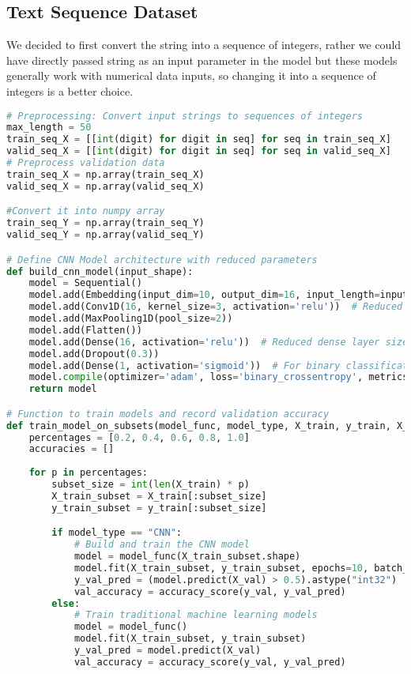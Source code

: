 \documentclass{article} %
\begin{document}
\subsection{Text Sequence Dataset} 
We decided to first convert the string into a sequence of integers, rather we could have directly passed string as an input parameter in the model but these models generally work with numerical data inputs, so changing it into a sequence of integers is a better choice. 

\begin{lstlisting}[language=Python]
# Preprocessing: Convert input strings to sequences of integers
max_length = 50
train_seq_X = [[int(digit) for digit in seq] for seq in train_seq_X]
valid_seq_X = [[int(digit) for digit in seq] for seq in valid_seq_X] 
# Preprocess validation data
train_seq_X = np.array(train_seq_X)
valid_seq_X = np.array(valid_seq_X)

#Convert it into numpy array
train_seq_Y = np.array(train_seq_Y)
valid_seq_Y = np.array(valid_seq_Y)

# Define CNN Model architecture with reduced parameters
def build_cnn_model(input_shape):
    model = Sequential()
    model.add(Embedding(input_dim=10, output_dim=16, input_length=input_shape[1]))  # Reduced embedding dimension
    model.add(Conv1D(16, kernel_size=3, activation='relu'))  # Reduced number of filters
    model.add(MaxPooling1D(pool_size=2))
    model.add(Flatten())
    model.add(Dense(16, activation='relu'))  # Reduced dense layer size
    model.add(Dropout(0.3))
    model.add(Dense(1, activation='sigmoid'))  # For binary classification
    model.compile(optimizer='adam', loss='binary_crossentropy', metrics=['accuracy'])
    return model

# Function to train models and record validation accuracy
def train_model_on_subsets(model_func, model_type, X_train, y_train, X_val, y_val):
    percentages = [0.2, 0.4, 0.6, 0.8, 1.0]
    accuracies = []
    
    for p in percentages:
        subset_size = int(len(X_train) * p)
        X_train_subset = X_train[:subset_size]
        y_train_subset = y_train[:subset_size]

        if model_type == "CNN":
            # Build and train the CNN model
            model = model_func(X_train_subset.shape)
            model.fit(X_train_subset, y_train_subset, epochs=10, batch_size=64, verbose=0)
            y_val_pred = (model.predict(X_val) > 0.5).astype("int32")
            val_accuracy = accuracy_score(y_val, y_val_pred)
        else:
            # Train traditional machine learning models
            model = model_func()
            model.fit(X_train_subset, y_train_subset)
            y_val_pred = model.predict(X_val)
            val_accuracy = accuracy_score(y_val, y_val_pred)


\end{lstlisting}
\end{document}
